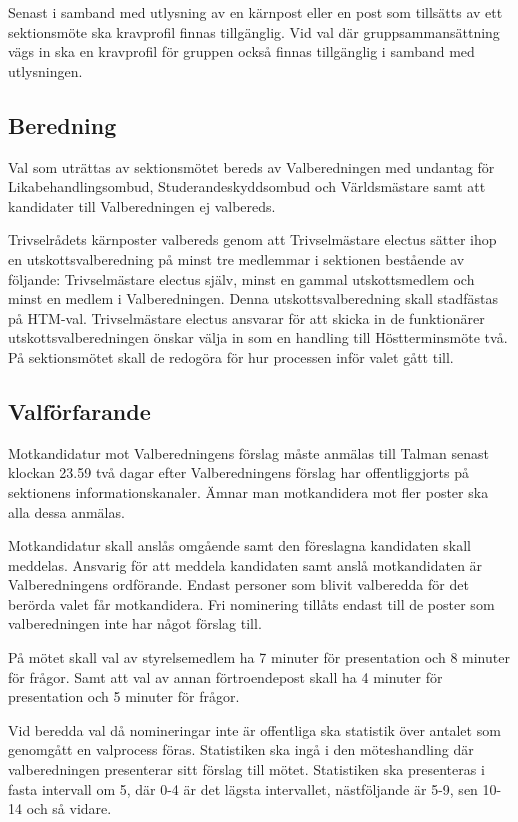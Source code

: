 \documentclass{dsekprotokoll}
\begin{document}
Senast i samband med utlysning av en kärnpost eller en post som tillsätts av ett sektionsmöte ska kravprofil finnas tillgänglig. Vid val där gruppsammansättning vägs in ska en kravprofil för gruppen också finnas
tillgänglig i samband med utlysningen.

\subsection{Beredning}
Val som uträttas av sektionsmötet bereds av Valberedningen med undantag för Likabehandlingsombud, Studerandeskyddsombud och Världsmästare samt att kandidater till Valberedningen ej valbereds.

Trivselrådets kärnposter valbereds genom att Trivselmästare electus sätter ihop en utskottsvalberedning på minst tre medlemmar i sektionen bestående av följande: Trivselmästare electus själv, minst en gammal utskottsmedlem och minst en medlem i Valberedningen. Denna utskottsvalberedning skall stadfästas på HTM-val. Trivselmästare electus ansvarar för att skicka in de funktionärer utskottsvalberedningen önskar välja in som en handling till Höstterminsmöte två. På sektionsmötet skall de redogöra för hur processen inför valet gått till.

\subsection{Valförfarande}
Motkandidatur mot Valberedningens förslag måste anmälas till Talman senast klockan 23.59 två dagar efter Valberedningens förslag har offentliggjorts på sektionens informationskanaler. Ämnar man motkandidera mot fler poster ska alla dessa anmälas.

Motkandidatur skall anslås omgående samt den föreslagna kandidaten skall meddelas. Ansvarig för att meddela kandidaten samt anslå motkandidaten är Valberedningens ordförande. Endast personer som blivit valberedda för det berörda valet får motkandidera.
Fri nominering tillåts endast till de poster som valberedningen inte har något förslag till.

På mötet skall val av styrelsemedlem ha 7 minuter för presentation och 8 minuter för frågor. Samt att val av annan förtroendepost skall ha 4 minuter för presentation och 5 minuter för frågor.

Vid beredda val då nomineringar inte är offentliga ska statistik över antalet som genomgått en valprocess föras. Statistiken ska ingå i den möteshandling där valberedningen presenterar sitt förslag till mötet. Statistiken ska presenteras i fasta intervall om 5, där 0-4
är det lägsta intervallet, nästföljande är 5-9, sen 10-14 och så
vidare.
\end{document}
